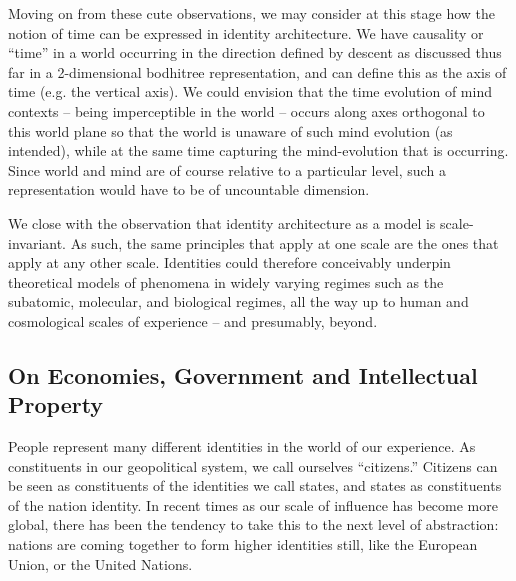 \documentclass[pra,twocolumn,groupedaddress,10pt]{revtex4}
\theoremstyle{definition}
\begin{document}

Moving on from these cute observations, we may consider at this stage how the notion of time can be expressed in identity architecture. We have causality or ``time'' in a world occurring in the direction defined by descent as discussed thus far in a 2-dimensional bodhitree representation, and can define this as the axis of time (e.g. the vertical axis). We could envision that the time evolution of mind contexts -- being imperceptible in the world -- occurs along axes orthogonal to this world plane so that the world is unaware of such mind evolution (as intended), while at the same time capturing the mind-evolution that is occurring. Since world and mind are of course relative to a particular level, such a representation would have to be of uncountable dimension.

We close with the observation that identity architecture as a model is scale-invariant. As such, the same principles that apply at one scale are the ones that apply at any other scale. Identities could therefore conceivably underpin theoretical models of phenomena in widely varying regimes such as the subatomic, molecular, and biological regimes, all the way up to human and cosmological scales of experience -- and presumably, beyond.


\subsection{On Economies, Government and Intellectual Property} \label{sec:ecogovintpro}

People represent many different identities in the world of our experience. As constituents in our geopolitical system, we call ourselves ``citizens.'' Citizens can be seen as constituents of the identities we call states, and states as constituents of the nation identity. In recent times as our scale of influence has become more global, there has been the tendency to take this to the next level of abstraction: nations are coming together to form higher identities still, like the European Union, or the United Nations.
\end{document}
